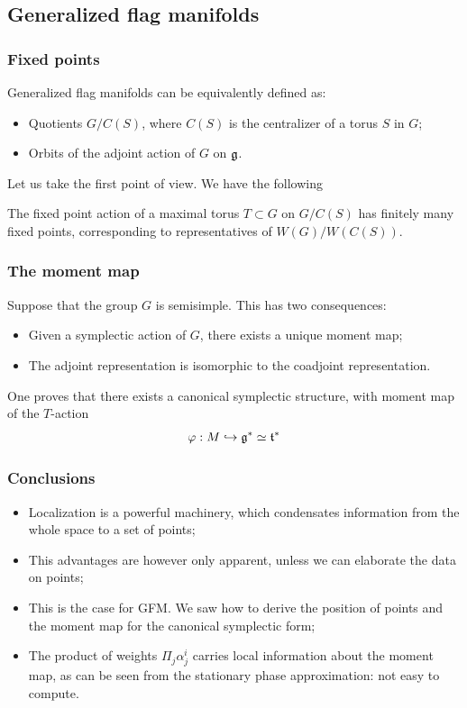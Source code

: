 \documentclass{beamer}
\begin{document}
\subsection{Generalized flag manifolds}
\begin{frame}
\frametitle{Fixed points}
\begin{definition}{}
Generalized flag manifolds can be equivalently defined as:
\begin{itemize}
\item
Quotients $G/C(S)$, where $C(S)$ is the centralizer of a torus $S$ in $G$;
\item
Orbits of the adjoint action of $G$ on $\frak g$.
\end{itemize}
\end{definition}
Let us take the first point of view. We have the following
\begin{theorem}
The fixed point action of a maximal torus $T\subset G$ on $G/C(S)$ has finitely many fixed points, corresponding to representatives of $W(G)/W(C(S))$.
\end{theorem}
\end{frame}


\begin{frame}
\frametitle{The moment map}
Suppose that the group $G$ is semisimple. This has two consequences:
\begin{itemize}
\item Given a symplectic action of $G$, there exists a unique moment map;
\item The adjoint representation is isomorphic to the coadjoint representation.
\end{itemize}
One proves that there exists a canonical symplectic structure, with moment map of the $T$-action
\[
\varphi:M\hookrightarrow\frak g^*\simeq\frak t^*
\]
\end{frame}


\begin{frame}
\frametitle{Conclusions}
\begin{itemize}
\item Localization is a powerful machinery, which condensates information from the whole space to a set of points;
\item This advantages are however only apparent, unless we can elaborate the data on points;
\item This is the case for GFM. We saw how to derive the position of points and the moment map for the canonical symplectic form;
\item The product of weights $\Pi_j\alpha^i_j$ carries local information about the moment map, as can be seen from the stationary phase approximation: not easy to compute.
\end{itemize}
\end{frame}

\end{document}
